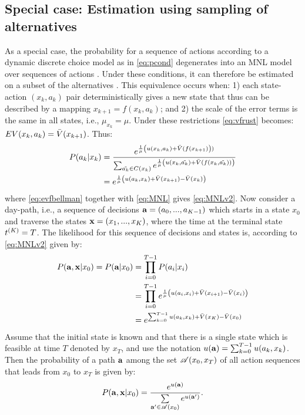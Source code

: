 \subsection{Special case: Estimation using sampling of alternatives}
As a special case, the probability for a sequence of actions according to a dynamic discrete choice model as in \eqref{eq:pcond} degenerates into an MNL model over sequences of actions \citep{fosgerau2013}. Under these conditions, it can therefore be estimated on a subset of the alternatives \citep{mcfadden78}. This equivalence occurs when: 1) each state-action $(x_{k},a_{k})$ pair deterministically gives a new state that thus can be described by a mapping $x_{k+1}=f(x_{k},a_{k})$; and 2) the scale of the error terms is the same in all states, i.e., $\mu_{x_k}=\mu$. Under these restrictions \eqref{eq:vfrust} becomes: $EV(x_{k},a_{k})=\bar{V}(x_{k+1})$. Thus:
\begin{align}
P(a_k|x_k) &= \frac{e^{\frac{1}{\mu}\left(\avgu(x_k,a_k) + \ev(f(x_{k+1})\right))}}{\sum_{\akt \in C(x_k)}e^{\frac{1}{\mu}\left(\avgu(x_k,\akt) + \ev(f(x_k,\akt))\right)}} \label{eq:MNL}\\
&=e^{\frac{1}{\mu}\left(\avgu(a_k,x_k) + \ev(x_{k+1})- \ev(x_k)\right)}\label{eq:MNLv2}
\end{align}
where \eqref{eq:evfbellman} together with \eqref{eq:MNL} gives \eqref{eq:MNLv2}. Now consider a day-path, i.e., a sequence of decisions  ${\bf a} = (a_0,...,a_{K-1})$ which starts in a state $x_0$ and traverse the states ${\bf x} = (x_1,...,x_{K})$, where the time at the terminal state $t^{(K)}=T$. The likelihood for this sequence of decisions and states is, according to \eqref{eq:MNLv2} given by:
\begin{equation}\label{eq:pPath0}
\begin{aligned}
P(\ve{a},\ve{x}|x_0) = P(\ve{a}|x_0) &= \prod_{i=0}^{T-1}P(a_i|x_i) \\
& = \prod_{i=0}^{T-1} e^{\frac{1}{\mu}\left(\avgu(a_i,x_i) + \ev(x_{i+1})-\ev(x_i)\right)} \\
& =  e^{\sum_{k=0}^{T-1} \avgu(a_k,x_k) + \ev(x_{K})-\ev(x_0)} 
\end{aligned}
\end{equation}
Assume that the initial state is known and that there is a single state which is feasible at time $T$ denoted by $x_T$, and use the notation $u({\bf a})=\sum_{k=0}^{T-1} u(a_k,x_k)$. Then the probability of a path ${\bf a}$ among the set $\mathscr{A}(x_0,x_T)$ of all action sequences that leads from $x_0$ to $x_T$ is given by:
\begin{equation}
P(\ve{a},\ve{x}|x_0) = \frac{e^{u(\ve{a})}}{\sum\limits_{\ve{a'} \in \Agood(x_0)}e^{u(\ve{a'})} }.
\end{equation}

